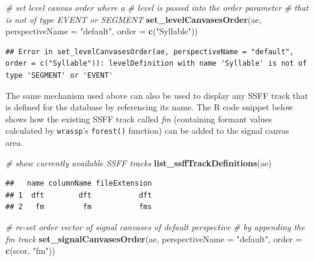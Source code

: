 \documentclass[]{book}
\newenvironment{Shaded}{\begin{snugshade}}{\end{snugshade}}
\newcommand{\CommentTok}[1]{\textcolor[rgb]{0.56,0.35,0.01}{\textit{#1}}}
\newcommand{\DataTypeTok}[1]{\textcolor[rgb]{0.13,0.29,0.53}{#1}}
\newcommand{\KeywordTok}[1]{\textcolor[rgb]{0.13,0.29,0.53}{\textbf{#1}}}
\newcommand{\NormalTok}[1]{#1}
\newcommand{\StringTok}[1]{\textcolor[rgb]{0.31,0.60,0.02}{#1}}
\theoremstyle{definition}
\theoremstyle{definition}
\theoremstyle{definition}
\theoremstyle{remark}
\begin{document}
\begin{Shaded}
\begin{Highlighting}[]
\CommentTok{# set level canvas order where a}
\CommentTok{# level is passed into the order parameter}
\CommentTok{# that is not of type EVENT or SEGMENT}
\KeywordTok{set_levelCanvasesOrder}\NormalTok{(ae,}
                       \DataTypeTok{perspectiveName =} \StringTok{"default"}\NormalTok{,}
                       \DataTypeTok{order =} \KeywordTok{c}\NormalTok{(}\StringTok{"Syllable"}\NormalTok{))}
\end{Highlighting}
\end{Shaded}

\begin{verbatim}
## Error in set_levelCanvasesOrder(ae, perspectiveName = "default", order = c("Syllable")): levelDefinition with name 'Syllable' is not of type 'SEGMENT' or 'EVENT'
\end{verbatim}

The same mechanism used above can also be used to display any SSFF track
that is defined for the database by referencing its name. The R code
snippet below shows how the existing SSFF track called \emph{fm}
(containing formant values calculated by \texttt{wrassp}'s
\texttt{forest()} function) can be added to the signal canvas area.

\begin{Shaded}
\begin{Highlighting}[]
\CommentTok{# show currently available SSFF tracks}
\KeywordTok{list_ssffTrackDefinitions}\NormalTok{(ae)}
\end{Highlighting}
\end{Shaded}

\begin{verbatim}
##   name columnName fileExtension
## 1  dft        dft           dft
## 2   fm         fm           fms
\end{verbatim}

\begin{Shaded}
\begin{Highlighting}[]
\CommentTok{# re-set order vector of signal canvases of default perspective}
\CommentTok{# by appending the fm track}
\KeywordTok{set_signalCanvasesOrder}\NormalTok{(ae,}
                        \DataTypeTok{perspectiveName =} \StringTok{"default"}\NormalTok{,}
                        \DataTypeTok{order =} \KeywordTok{c}\NormalTok{(scor, }\StringTok{"fm"}\NormalTok{))}
\end{Highlighting}
\end{Shaded}
\end{document}

